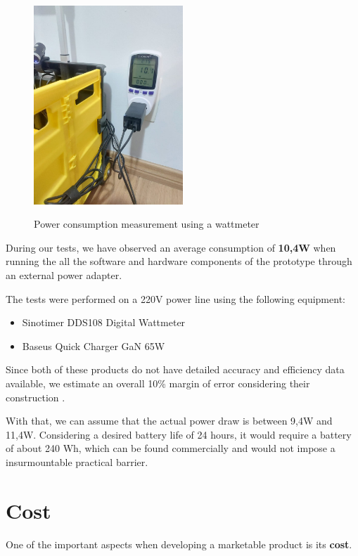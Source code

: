 \begin{figure}[H]
	\centering
	\caption[Power consumption measurement using a wattmeter]{Power consumption measurement using a wattmeter}
    \includegraphics[width=0.5\textwidth]{./images/powerconsumption.jpeg}
	\fonte{}
    \label{fig:wattmeter}
\end{figure}

During our tests, we have observed an average consumption of \textbf{10,4W}
when running the all the software and hardware components of the prototype
through an external power adapter. 

The tests were performed on a 220V power line using the following equipment:
\begin{itemize}
    \item Sinotimer DDS108 Digital Wattmeter
    \item Baseus Quick Charger GaN 65W
\end{itemize}

Since both of these products do not have detailed accuracy and efficiency data
available, we estimate an overall 10\% margin of error considering their
construction \cite{Chen2017}. 

With that, we can assume that the actual power draw is between 9,4W and 11,4W.
Considering a desired  battery life of 24 hours, it would require a battery of
about 240 Wh, which can be found commercially and would not impose a
insurmountable practical barrier.

\section{Cost}

One of the important aspects when developing a marketable product is its \textbf{cost}.


